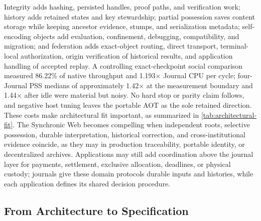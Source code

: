 Integrity adds hashing, persisted handles, proof paths, and verification work; history adds retained states and key stewardship; partial possession saves content storage while keeping ancestor evidence, stumps, and serialization metadata; self-encoding objects add evaluation, confinement, debugging, compatibility, and migration; and federation adds exact-object routing, direct transport, terminal-local authorization, origin verification of historical results, and application handling of accepted replay. A controlling exact-checkpoint social comparison measured 86.22\% of native throughput and 1.193$\times$ Journal CPU per cycle; four-Journal PSS medians of approximately 1.42$\times$ at the measurement boundary and 1.44$\times$ after idle were material but noisy. No hard stop or parity claim follows, and negative host tuning leaves the portable AOT as the sole retained direction. These costs make architectural fit important, as summarized in \cref{tab:architectural-fit}. The Synchronic Web becomes compelling when independent roots, selective possession, durable interpretation, historical correction, and cross-institutional evidence coincide, as they may in production traceability, portable identity, or decentralized archives. Applications may still add coordination above the journal layer for payments, settlement, exclusive allocation, deadlines, or physical custody; journals give these domain protocols durable inputs and histories, while each application defines its shared decision procedure.

\begin{table}[htbp]
  \centering
  \small
  
  \caption{Architectural Fit}
  \label{tab:architectural-fit}
\end{table}

\subsection{From Architecture to Specification}


